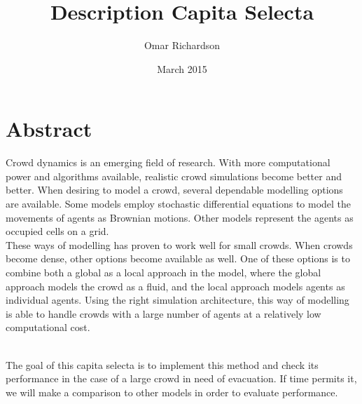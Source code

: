 \documentclass{article}
\title{Description Capita Selecta}
\author{Omar Richardson}
\date{March 2015}
\begin{document}
\maketitle

\section{Abstract}
Crowd dynamics is an emerging field of research. With more computational power and algorithms available, realistic crowd simulations become better and better. When desiring to model a crowd, several dependable modelling options are available. Some models employ stochastic differential equations to model the movements of agents as Brownian motions. Other models represent the agents as occupied cells on a grid.
\ \\
These ways of modelling has proven to work well for small crowds. When crowds become dense, other options become available as well. One of these options is to combine both a global as a local approach in the model, where the global approach models the crowd as a fluid, and the local approach models agents as individual agents. Using the right simulation architecture, this way of modelling is able to handle crowds with a large number of agents at a relatively low computational cost.

\ \\
The goal of this capita selecta is to implement this method and check its performance in the case of a large crowd in need of evacuation. If time permits it, we will make a comparison to other models in order to evaluate performance.

\newpage
\end{document}
